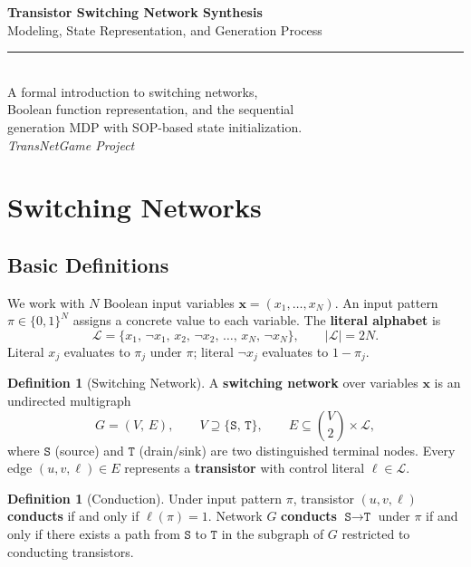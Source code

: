 \documentclass[11pt, a4paper]{article}
\theoremstyle{plain}
\theoremstyle{definition}
\newtheorem{definition}[theorem]{Definition}
\theoremstyle{remark}
\newcommand{\SOURCE}{\texttt{S}}
\newcommand{\SINK}{\texttt{T}}
\begin{document}
\begin{titlepage}
  \centering
  \vspace*{4cm}
  {\Huge\bfseries\color{accentblue}
    Transistor Switching Network Synthesis}\\[0.8em]
  {\Large\color{accentgray}
    Modeling, State Representation, and Generation Process}\\[2.5em]
  \rule{0.5\linewidth}{0.8pt}\\[2em]
  {\normalsize
    A formal introduction to switching networks,\\
    Boolean function representation, and the sequential\\
    generation MDP with SOP-based state initialization.\\[1em]
    \textit{TransNetGame Project}
  }
  \vfill
\end{titlepage}

\tableofcontents
\newpage

\section{Switching Networks}

\subsection{Basic Definitions}

We work with $N$ Boolean input variables $\mathbf{x} = (x_1, \ldots, x_N)$.
An input pattern $\pi \in \{0,1\}^N$ assigns a concrete value to each
variable.  The \textbf{literal alphabet} is
\[
  \mathcal{L} = \{x_1,\, \lnot x_1,\, x_2,\, \lnot x_2,\,
                  \ldots,\, x_N,\, \lnot x_N\},
  \qquad |\mathcal{L}| = 2N.
\]
Literal $x_j$ evaluates to $\pi_j$ under $\pi$; literal $\lnot x_j$
evaluates to $1 - \pi_j$.

\begin{definition}[Switching Network]
A \textbf{switching network} over variables $\mathbf{x}$ is an
undirected multigraph
\[
  G = (V,\, E), \qquad
  V \supseteq \{\SOURCE,\, \SINK\}, \qquad
  E \subseteq \binom{V}{2} \times \mathcal{L},
\]
where $\SOURCE$ (source) and $\SINK$ (drain/sink) are two
distinguished terminal nodes. Every edge $(u, v, \ell) \in E$
represents a \textbf{transistor} with control literal $\ell \in
\mathcal{L}$.
\end{definition}

\begin{definition}[Conduction]
Under input pattern $\pi$, transistor $(u, v, \ell)$
\textbf{conducts} if and only if $\ell(\pi) = 1$.  Network $G$
\textbf{conducts} $\SOURCE \to \SINK$ under $\pi$ if and only if
there exists a path from $\SOURCE$ to $\SINK$ in the subgraph of
$G$ restricted to conducting transistors.
\end{definition}
\end{document}
